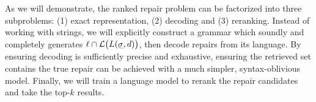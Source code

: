 \documentclass[sigplan,review,acmsmall,nonacm,screen,anonymous]{acmart}\settopmatter{printfolios=false,printccs=false,printacmref=false}
\begin{document}
As we will demonstrate, the ranked repair problem can be factorized into three subproblems: (1) exact representation, (2) decoding and (3) reranking. Instead of working with strings, we will explicitly construct a grammar which soundly and completely generates $\ell \cap \mathcal{L}\big(L(\err\sigma, d)\big)$, then decode repairs from its language. By ensuring decoding is sufficiently precise and exhaustive, ensuring the retrieved set contains the true repair can be achieved with a much simpler, syntax-oblivious model. Finally, we will train a language model to rerank the repair candidates and take the top-$k$ results.

%
%
%
%
\end{document}

